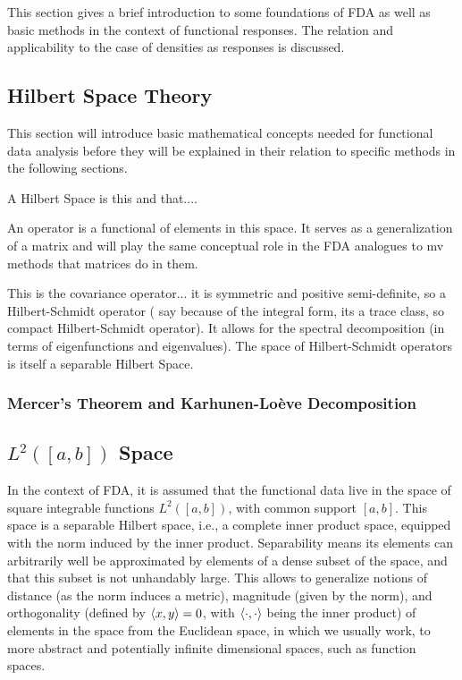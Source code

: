 This section gives a brief introduction to some foundations of FDA as well as basic
methods in the context of functional responses. The relation and applicability to the
case of densities as responses is discussed.

\subsection{Hilbert Space Theory}
\label{sec:hilber spaces and linear operators}
This section will introduce basic mathematical concepts needed for functional data
analysis before they will be explained in their relation to specific methods in the
following sections.

A Hilbert Space is this and that....

An operator is a functional of elements in this space. It serves as a generalization of
a matrix and will play the same conceptual role in the FDA analogues to mv methods
that matrices do in them.

This is the covariance operator... it is symmetric and positive semi-definite, so
a Hilbert-Schmidt operator (\cite{WangChiouMüller2016} say because of the integral form,
its a trace class, so compact Hilbert-Schmidt operator). It allows for the spectral
decomposition (in terms of eigenfunctions and eigenvalues). The space of Hilbert-Schmidt
operators is itself a separable Hilbert Space.

\subsubsection{Mercer's Theorem and Karhunen-Loève Decomposition}
\label{sec:mercer and kh}

\subsection{$L^2([a, b])$ Space}
\label{sec:l2 space}
In the context of FDA, it is assumed that the functional data live in
the space of square integrable functions $L^2([a,b])$, with common
support $[a,b]$. This space is a separable Hilbert space, i.e., a complete inner
product space, equipped with the norm induced by the inner product. Separability means
its elements can arbitrarily well be approximated by elements of a dense subset of the
space, and that this subset is not unhandably large.
This allows to generalize notions of distance (as the norm induces a
metric), magnitude (given by the norm), and orthogonality (defined by
$\left \langle x, y \right \rangle = 0$, with $\left \langle \cdot, \cdot \right \rangle$ being the inner product) of elements
in the space from the Euclidean space, in which we usually work, to more
abstract and potentially infinite dimensional spaces, such as function
spaces.

